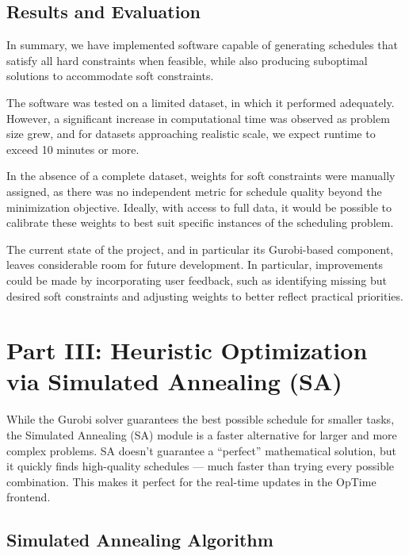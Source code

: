 \documentclass[11pt,a4paper]{article}
\begin{document}
\subsection{Results and Evaluation}
In summary, we have implemented software capable of generating schedules that satisfy all hard constraints when feasible, while also producing suboptimal solutions to accommodate soft constraints.

The software was tested on a limited dataset, in which it performed adequately. However, a significant increase in computational time was observed as problem size grew, and for datasets approaching realistic scale, we expect runtime to exceed 10 minutes or more.

In the absence of a complete dataset, weights for soft constraints were manually assigned, as there was no independent metric for schedule quality beyond the minimization objective. Ideally, with access to full data, it would be possible to calibrate these weights to best suit specific instances of the scheduling problem.

The current state of the project, and in particular its Gurobi-based component, leaves considerable room for future development. In particular, improvements could be made by incorporating user feedback, such as identifying missing but desired soft constraints and adjusting weights to better reflect practical priorities.

\section{Part III: Heuristic Optimization via Simulated Annealing (SA)}

While the Gurobi solver guarantees the best possible schedule for smaller tasks, the Simulated Annealing (SA) module is a faster alternative for larger and more complex problems. SA doesn't guarantee a ``perfect'' mathematical solution, but it quickly finds high-quality schedules — much faster than trying every possible combination. This makes it perfect for the real-time updates in the OpTime frontend.

\subsection{Simulated Annealing Algorithm}
\end{document}
